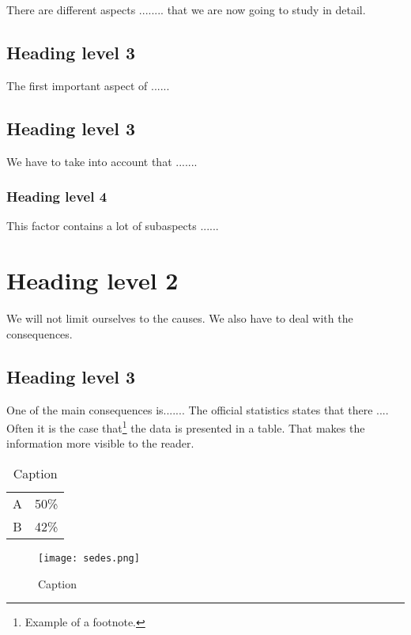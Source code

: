 \documentclass[12pt,a4paper,oneside]{report}
\begin{document}
There are different aspects ........ that we are now going to study in detail.

\subsection{Heading level 3}

The first important aspect of ......

\subsection{Heading level 3}

We have to take into account that .......

\subsubsection{Heading level 4}

This factor contains a lot of subaspects ......

\section{Heading level 2}

We will not limit ourselves to the causes. We also have to deal with the consequences.

\subsection{Heading level 3}

One of the main consequences is....... The official statistics states that there ....\\

Often it is the case that\footnote{Example of a footnote.} the data is presented in a table. That makes the information more visible to the reader.

\begin{table}[h]
    \centering
    \begin{tabular}{c|c}
        A & 50\% \\
        B & 42\%
    \end{tabular}
    \caption{Caption}
    \label{tab:my_label}
\end{table}

\begin{figure}
    \centering
    \texttt{[image: sedes.png]}
    \caption{Caption}
    \label{fig:enter-label}
\end{figure}
\end{document}
